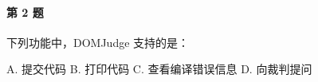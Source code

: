 \paragraph{第 2 题} 下列功能中，DOMJudge 支持的是：

A. 提交代码 \quad
B. 打印代码 \quad
C. 查看编译错误信息 \quad
D. 向裁判提问 \quad
